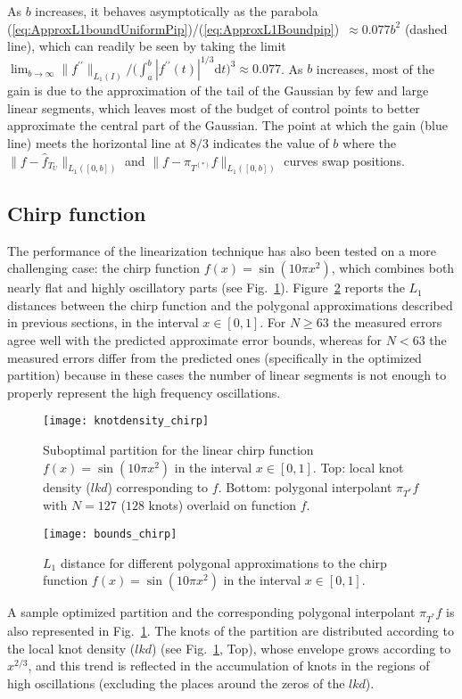 \documentclass[a4paper,english]{IEEEtran}
\begin{document}
As $b$ increases, it behaves asymptotically as the parabola (\ref{eq:ApproxL1boundUniformPip})/(\ref{eq:ApproxL1Boundpip})~$\approx0.077b^{2}$
(dashed line), which can readily be seen by taking the limit $\lim_{b\to\infty}\|{{f}^{\prime\prime}}\|_{{L_{1}}(I)}/\bigl(\int_{a}^{b}\left|{{f}^{\prime\prime}}(t)\right|^{1/3}\mathrm{d}t\bigr)^{3}\approx0.077$.
As $b$ increases, most of the gain is due to the approximation of
the tail of the Gaussian by few and large linear segments, which leaves
most of the budget of control points to better approximate the central
part of the Gaussian. The point at which the gain (blue line) meets
the horizontal line at $8/3$ indicates the value of $b$ where the
$\|{f}-{\hat{f}}_{{T}_{U}}\|_{{L_{1}}([0,b])}$ and $\|{f}-{\pi_{{T}^{(\ast)}}}{f}\|_{{L_{1}}([0,b])}$
curves swap positions.

\subsection*{Chirp function}

The performance of the linearization technique has also been tested
on a more challenging case: the chirp function $f(x)=\sin(10\pi x^{2})$,
which combines both nearly flat and highly oscillatory parts (see
Fig.~\ref{fig:Chirp}). Figure~\ref{fig:GraphicalErrorsChirp} reports
the ${L_{1}}$ distances between the chirp function and the polygonal
approximations described in previous sections, in the interval $x\in[0,1]$.
For $N\geq63$ the measured errors agree well with the predicted approximate
error bounds, whereas for $N<63$ the measured errors differ from
the predicted ones (specifically in the optimized partition) because
in these cases the number of linear segments is not enough to properly
represent the high frequency oscillations. 

\begin{figure}
\centering{}\texttt{[image: knotdensity\_chirp]}\caption{\textbf{\label{fig:Chirp}}Suboptimal partition for the linear chirp
function $f(x)=\sin(10\pi x^{2})$ in the interval $x\in[0,1]$. Top:
local knot density ($lkd$) corresponding to $f$. Bottom: polygonal
interpolant ${\pi_{{T}^{\ast}}} f$ with $N=127$ ($128$ knots) overlaid on
function $f$. }
\end{figure}
\begin{figure}
\begin{centering}
\texttt{[image: bounds\_chirp]}
\par\end{centering}

\caption{\label{fig:GraphicalErrorsChirp}${L_{1}}$ distance for different polygonal
approximations to the chirp function $f(x)=\sin(10\pi x^{2})$ in
the interval $x\in[0,1]$.}
\end{figure}
A sample optimized partition and the corresponding polygonal interpolant
${\pi_{{T}^{\ast}}} f$ is also represented in Fig.~\ref{fig:Chirp}. The knots
of the partition are distributed according to the local knot density
($lkd$) (see Fig.~\ref{fig:Chirp}, Top), whose envelope grows according
to $x^{2/3}$, and this trend is reflected in the accumulation of
knots in the regions of high oscillations (excluding the places around
the zeros of the $lkd$). 
\end{document}
